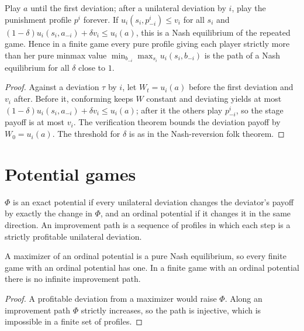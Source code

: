 \begin{theorem}
\label{thm:minmax-folk}
\leanok
{}
Play $a$ until the first deviation; after a unilateral deviation by $i$, play the punishment profile
$p^i$ forever. If $u_i(s_i,p^i_{-i})\le v_i$ for all $s_i$ and $(1-\delta)u_i(s_i,a_{-i})+\delta v_i\le u_i(a)$,
this is a Nash equilibrium of the repeated game. Hence in a finite game every pure profile giving each
player strictly more than her pure minmax value $\min_{b_{-i}}\max_{s_i}u_i(s_i,b_{-i})$ is the path
of a Nash equilibrium for all $\delta$ close to $1$.
\end{theorem}
\begin{proof}
\leanok
Against a deviation $\tau$ by $i$, let $W_t=u_i(a)$ before the first deviation and $v_i$ after. Before it,
conforming keeps $W$ constant and deviating yields at most $(1-\delta)u_i(s_i,a_{-i})+\delta v_i\le u_i(a)$;
after it the others play $p^i_{-i}$, so the stage payoff is at most $v_i$. The verification theorem bounds
the deviation payoff by $W_0=u_i(a)$. The threshold for $\delta$ is as in the Nash-reversion folk theorem.
\end{proof}

\section{Potential games}
\label{sec:potential}

\begin{definition}
\label{def:potential}
\leanok
{}
$\Phi$ is an exact potential if every unilateral deviation changes the deviator's payoff by exactly the change in
$\Phi$, and an ordinal potential if it changes it in the same direction. An improvement path is a sequence of
profiles in which each step is a strictly profitable unilateral deviation.
\end{definition}

\begin{theorem}
\label{thm:potential}
\leanok
{}
A maximizer of an ordinal potential is a pure Nash equilibrium, so every finite game with an ordinal potential has
one. In a finite game with an ordinal potential there is no infinite improvement path.
\end{theorem}
\begin{proof}
\leanok
A profitable deviation from a maximizer would raise $\Phi$. Along an improvement path $\Phi$ strictly increases, so
the path is injective, which is impossible in a finite set of profiles.
\end{proof}

